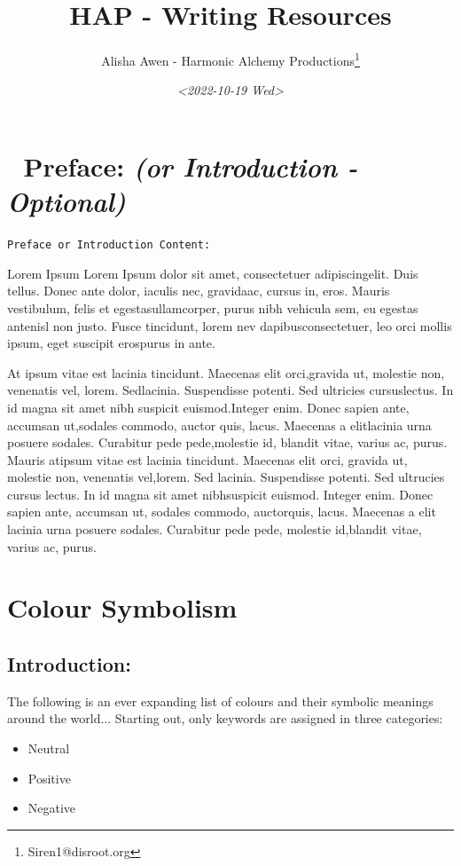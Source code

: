 \documentclass[openleft,oneside,showtrims]{memoir}
\author{Alisha Awen - Harmonic Alchemy Productions\thanks{Siren1@disroot.org}}
\date{\textit{<2022-10-19 Wed>}}
\title{HAP - Writing Resources}
\begin{document}
\maketitle
\setcounter{tocdepth}{3}
\tableofcontents

\chapter{📃 Preface: \emph{(or Introduction - Optional)}}
\label{sec:orgd221aa8}
\label{BOOK_PREFACE}
\texttt{Preface or Introduction Content:} 

Lorem Ipsum Lorem Ipsum dolor sit amet, consectetuer adipiscingelit. Duis tellus. Donec ante dolor, iaculis nec, gravidaac, cursus in, eros. Mauris vestibulum, felis et egestasullamcorper, purus nibh vehicula sem, eu egestas antenisl non justo. Fusce tincidunt, lorem nev dapibusconsectetuer, leo orci mollis ipsum, eget suscipit erospurus in ante.

At ipsum vitae est lacinia tincidunt. Maecenas elit orci,gravida ut, molestie non, venenatis vel, lorem. Sedlacinia. Suspendisse potenti. Sed ultricies cursuslectus. In id magna sit amet nibh suspicit euismod.Integer enim. Donec sapien ante, accumsan ut,sodales commodo, auctor quis, lacus. Maecenas a elitlacinia urna posuere sodales. Curabitur pede pede,molestie id, blandit vitae, varius ac, purus. Mauris atipsum vitae est lacinia tincidunt. Maecenas elit orci, gravida ut, molestie non, venenatis vel,lorem. Sed lacinia. Suspendisse potenti. Sed ultrucies cursus lectus. In id magna sit amet nibhsuspicit euismod. Integer enim. Donec sapien ante, accumsan ut, sodales commodo, auctorquis, lacus. Maecenas a elit lacinia urna posuere sodales. Curabitur pede pede, molestie id,blandit vitae, varius ac, purus.



\mainmatter
\chapter{Colour Symbolism}
\label{sec:org2362132}
\label{CHAPTER_colour-symbolism}
\section{Introduction:}
\label{sec:orge4dc9d5}

The following is an ever expanding list of colours and their symbolic meanings around the world... Starting out, only keywords are assigned in three categories:

\begin{itemize}
\item Neutral
\item Positive
\item Negative
\end{itemize}
\end{document}
